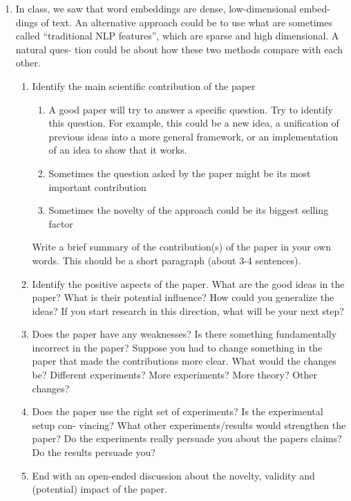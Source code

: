 \documentclass{article}
\begin{document}
\begin{enumerate}
\item In class, we saw that word embeddings are dense, low-dimensional embed- dings of text. An alternative approach could be to use what are sometimes called “traditional NLP features”, which are sparse and high dimensional. A natural ques- tion could be about how these two methods compare with each other.\\
\begin{enumerate}
\item Identify the main scientific contribution of the paper\\
\begin{enumerate}
\item A good paper will try to answer a specific question. Try to identify this question. For example, this could be a new idea, a unification of previous ideas into a more general framework, or an implementation of an idea to show that it works.
\item Sometimes the question asked by the paper might be its most important contribution
\item Sometimes the novelty of the approach could be its biggest selling factor
\end{enumerate}
Write a brief summary of the contribution(s) of the paper in your own words. This should be a short paragraph (about 3-4 sentences).
\item Identify the positive aspects of the paper. What are the good ideas in the paper? What is their potential influence? How could you generalize the ideas? If you start research in this direction, what will be your next step?
\item Does the paper have any weaknesses? Is there something fundamentally incorrect in the paper? Suppose you had to change something in the paper that made the contributions more clear. What would the changes be? Different experiments? More experiments? More theory? Other changes?
\item Does the paper use the right set of experiments? Is the experimental setup con- vincing? What other experiments/results would strengthen the paper? Do the experiments really persuade you about the papers claims? Do the results persuade you?
\item End with an open-ended discussion about the novelty, validity and (potential) impact of the paper.
\end{enumerate}
\end{enumerate}

\end{document}
